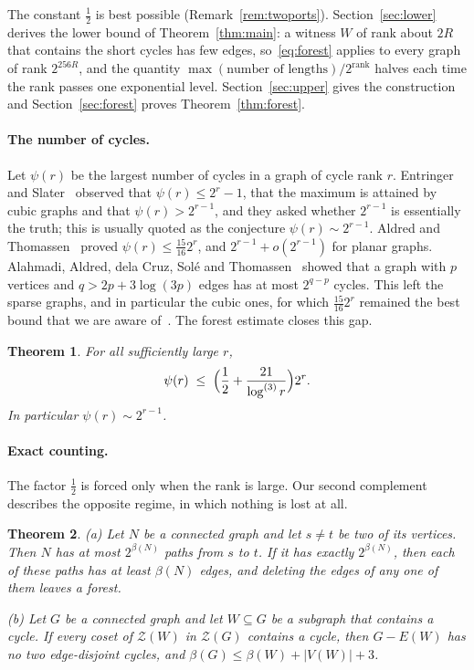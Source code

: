 \documentclass[11pt]{article}
\newtheorem{theorem}{Theorem}[section]
\theoremstyle{definition}
\theoremstyle{remark}
\newcommand{\Z}{\mathcal{Z}}
\newcommand{\lgk}[1]{\log^{(#1)}}
\newcommand{\half}{\tfrac12}
\begin{document}
The constant $\half$ is best possible (Remark~\ref{rem:twoports}). Section~\ref{sec:lower} derives the
lower bound of Theorem~\ref{thm:main}: a witness $W$ of rank about $2R$ that contains the short cycles
has few edges, so~\eqref{eq:forest} applies to every graph of rank $2^{256R}$, and the quantity
$\max(\text{number of lengths})/2^{\text{rank}}$ halves each time the rank passes one exponential
level. Section~\ref{sec:upper} gives the construction and Section~\ref{sec:forest} proves
Theorem~\ref{thm:forest}.

\paragraph{The number of cycles.}
Let $\psi(r)$ be the largest number of cycles in a graph of cycle rank $r$. Entringer and
Slater~\cite{ES} observed that $\psi(r)\le2^{r}-1$, that the maximum is attained by cubic graphs and
that $\psi(r)>2^{r-1}$, and they asked whether $2^{r-1}$ is essentially the truth; this is usually
quoted as the conjecture $\psi(r)\sim2^{r-1}$. Aldred and Thomassen~\cite{AT} proved
$\psi(r)\le\frac{15}{16}2^{r}$, and $2^{r-1}+o(2^{r-1})$ for planar graphs. Alahmadi, Aldred, dela
Cruz, Sol\'e and Thomassen~\cite{AACST} showed that a graph with $p$ vertices and $q>2p+3\log(3p)$
edges has at most $2^{q-p}$ cycles. This left the sparse graphs, and in particular the cubic ones, for
which $\frac{15}{16}2^{r}$ remained the best bound that we are aware of~\cite{HK}. The forest estimate
closes this gap.

\begin{theorem}\label{thm:cycles}
For all sufficiently large $r$,
\[
  \psi(r)\;\le\;\Bigl(\frac12+\frac{21}{\lgk{3}r}\Bigr)2^{r}.
\]
In particular $\psi(r)\sim2^{r-1}$.
\end{theorem}

\paragraph{Exact counting.}
The factor $\half$ is forced only when the rank is large. Our second complement describes the opposite
regime, in which nothing is lost at all.

\begin{theorem}\label{thm:exact}
\textup{(a)} Let $N$ be a connected graph and let $s\ne t$ be two of its vertices. Then $N$ has at
most $2^{\beta(N)}$ paths from $s$ to $t$. If it has exactly $2^{\beta(N)}$, then each of these paths
has at least $\beta(N)$ edges, and deleting the edges of any one of them leaves a forest.

\textup{(b)} Let $G$ be a connected graph and let $W\subseteq G$ be a subgraph that contains a cycle.
If every coset of $\Z(W)$ in $\Z(G)$ contains a cycle, then $G-E(W)$ has no two edge-disjoint cycles,
and $\beta(G)\le\beta(W)+|V(W)|+3$.
\end{theorem}
\end{document}
